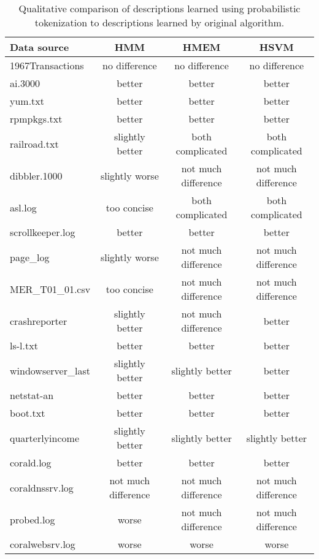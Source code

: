 \begin{table}[th]
\begin{center}
\begin{tabular}{|l||c|c|c|}\hline
Data source & HMM & HMEM & HSVM \\ \hline 
1967Transactions & no difference & no difference & no difference   \\\hline 
ai.3000 & better & better & better \\ \hline
yum.txt & better &  better & better \\ \hline
rpmpkgs.txt & better & better & better\\ \hline
railroad.txt & slightly better & both complicated & both complicated  \\ \hline
dibbler.1000 & slightly worse & not much difference & not much difference   \\ \hline
asl.log & too concise & both complicated & both complicated \\ \hline
scrollkeeper.log  &  better & better & better \\ \hline
page\_log  & slightly worse & not much difference & not much difference \\ \hline
MER\_T01\_01.csv & too concise & not much difference & not much difference \\ \hline
crashreporter & slightly better & not much difference & better \\ \hline
ls-l.txt & better & better & better \\ \hline
windowserver\_last & slightly better & slightly better & better \\ \hline
netstat-an & better & better & better \\ \hline
boot.txt & better &  better & better \\ \hline
quarterlyincome & slightly better & slightly better & slightly better   \\ \hline
corald.log & better &  better & better \\ \hline
coraldnssrv.log  & not much difference &  not much difference & not much difference\\ \hline
probed.log & worse & not much difference & not much difference \\ \hline
coralwebsrv.log & worse & worse & worse \\\hline
\end{tabular}
\caption{Qualitative comparison of descriptions learned using probabilistic
  tokenization to descriptions learned by original \learnpads{}
  algorithm.}
\label{tab:expert}
\end{center}
\end{table}

